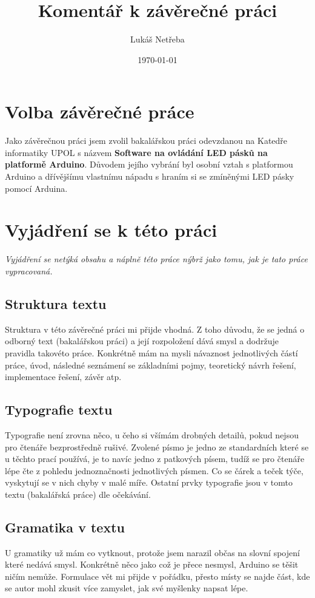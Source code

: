 \documentclass[a4paper, 12pt]{article}
\title{\bf Komentář k závěrečné práci}
\author{Lukáš Netřeba}
\date{\today}
\begin{document}
\maketitle
\newpage
\section{Volba závěrečné práce}
Jako závěrečnou práci jsem zvolil bakalářskou práci odevzdanou na Katedře informatiky UPOL s názvem {\bf Software na ovládání LED pásků na platformě Arduino}. Důvodem jejího vybrání byl osobní vztah s platformou Arduino a dřívějšímu vlastnímu nápadu s hraním si se zmíněnými LED pásky pomocí Arduina.

\section{Vyjádření se k této práci}
{\it Vyjádření se netýká obsahu a náplně této práce nýbrž jako tomu, jak je tato práce vypracovaná.}
\subsection{Struktura textu}
Struktura v této závěrečné práci mi přijde vhodná. Z toho důvodu, že se jedná o odborný text (bakalářskou práci) a její rozpoložení dává smysl a dodržuje pravidla takovéto práce. Konkrétně mám na mysli návaznost jednotlivých částí práce, úvod, následné seznámení se základními pojmy, teoretický návrh řešení, implementace řešení, závěr atp.
\subsection{Typografie textu}
Typografie není zrovna něco, u čeho si všímám drobných detailů, pokud nejsou pro čtenáře bezprostředně rušivé. Zvolené písmo je jedno ze standardních které se u těchto prací používá, je to navíc jedno z patkových písem, tudíž se pro čtenáře lépe čte z pohledu jednoznačnosti jednotlivých písmen. Co se čárek a teček týče, vyskytují se v nich chyby v malé míře. Ostatní prvky typografie jsou v tomto textu (bakalářská práce) dle očekávání.
\subsection{Gramatika v textu}
U gramatiky už mám co vytknout, protože jsem narazil občas na slovní spojení které nedává smysl. Konkrétně něco jako  což je přece nesmysl, Arduino se těšit ničím nemůže. Formulace vět mi přijde v pořádku, přesto místy se najde část, kde se autor mohl zkusit více zamyslet, jak své myšlenky napsat lépe. 
\end{document}
